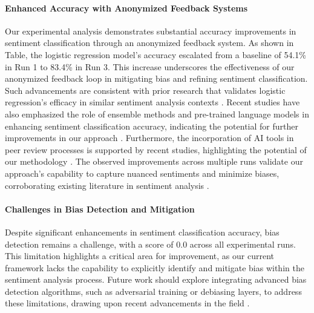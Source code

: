 \documentclass{article} %
\begin{document}
\paragraph{Enhanced Accuracy with Anonymized Feedback Systems} Our experimental analysis demonstrates substantial accuracy improvements in sentiment classification through an anonymized feedback system. As shown in Table, the logistic regression model's accuracy escalated from a baseline of 54.1\% in Run 1 to 83.4\% in Run 3. This increase underscores the effectiveness of our anonymized feedback loop in mitigating bias and refining sentiment classification. Such advancements are consistent with prior research that validates logistic regression's efficacy in similar sentiment analysis contexts \cite{sentiment2024,comparison2024,assessing2024,topic2024,innovative2024,comparative2023,sentiment2023,film2023,the2024,enhancing2024}. Recent studies have also emphasized the role of ensemble methods and pre-trained language models in enhancing sentiment classification accuracy, indicating the potential for further improvements in our approach \cite{an2023,pretrained2023}. Furthermore, the incorporation of AI tools in peer review processes is supported by recent studies, highlighting the potential of our methodology \cite{generative2025,using2024,enhancing2024}. The observed improvements across multiple runs validate our approach's capability to capture nuanced sentiments and minimize biases, corroborating existing literature in sentiment analysis \cite{confronting2022,automated2021,neural2025,emoshown2024,transformerbased2023,transsentlog2023,a2022,anomaly2021,sentiment2017,tick2024,quality2023,an2024,role2022,application2015,fasttext2022}.

\paragraph{Challenges in Bias Detection and Mitigation} Despite significant enhancements in sentiment classification accuracy, bias detection remains a challenge, with a score of 0.0 across all experimental runs. This limitation highlights a critical area for improvement, as our current framework lacks the capability to explicitly identify and mitigate bias within the sentiment analysis process. Future work should explore integrating advanced bias detection algorithms, such as adversarial training or debiasing layers, to address these limitations, drawing upon recent advancements in the field \cite{backdoor2023,latent2020,selfreported2023,studying1999,procare2012,electrochemical2001,adaptive2022,the2023,death2024,peer2020,reviewriter2025,peer2022,recognition2018,challenges2022,recognizability2022,the2024,a2025,decolonizing2025,level2025,emo2vec2018,advisory2024}.
\end{document}
